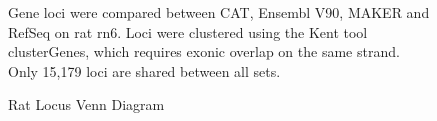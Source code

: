 \begin{figure}
\centering
{}
\caption{Rat Locus Venn Diagram}
Gene loci were compared between CAT, Ensembl V90, MAKER and RefSeq on rat rn6. Loci were clustered using the Kent tool clusterGenes, which requires exonic overlap on the same strand. Only 15,179 loci are shared between all sets.
\label{supp_fig:rat_locus_venn}
\end{figure}

